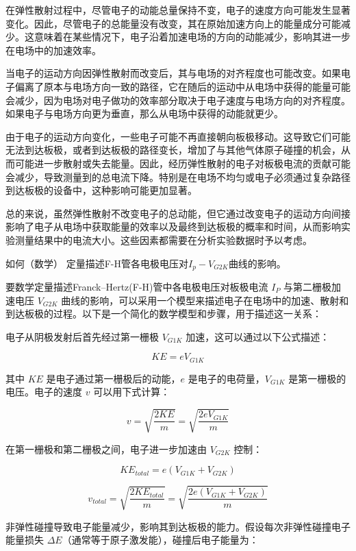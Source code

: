 \documentclass[dvipsnames, svgnames,a4paper,11pt]{article}
\begin{document}
	在弹性散射过程中，尽管电子的动能总量保持不变，电子的速度方向可能发生显著变化。因此，尽管电子的总能量没有改变，其在原始加速方向上的能量成分可能减少。这意味着在某些情况下，电子沿着加速电场的方向的动能减少，影响其进一步在电场中的加速效率。
	
	当电子的运动方向因弹性散射而改变后，其与电场的对齐程度也可能改变。如果电子偏离了原本与电场方向一致的路径，它在随后的运动中从电场中获得的能量可能会减少，因为电场对电子做功的效率部分取决于电子速度与电场方向的对齐程度。如果电子与电场方向更为垂直，那么从电场中获得的动能就更少。
	
	由于电子的运动方向变化，一些电子可能不再直接朝向板极移动。这导致它们可能无法到达板极，或者到达板极的路径变长，增加了与其他气体原子碰撞的机会，从而可能进一步散射或失去能量。因此，经历弹性散射的电子对板极电流的贡献可能会减少，导致测量到的总电流下降。特别是在电场不均匀或电子必须通过复杂路径到达板极的设备中，这种影响可能更加显著。
	
	总的来说，虽然弹性散射不改变电子的总动能，但它通过改变电子的运动方向间接影响了电子从电场中获取能量的效率以及最终到达板极的概率和时间，从而影响实验测量结果中的电流大小。这些因素都需要在分析实验数据时予以考虑。
	
	
	\begin{question}
		如何（数学） 定量描述F-H管各电极电压对$I_p-V_{G2K}$曲线的影响。
	\end{question}
	要数学定量描述Franck–Hertz(F-H)管中各电极电压对板极电流 \(I_P\) 与第二栅极加速电压 \(V_{G2K}\) 曲线的影响，可以采用一个模型来描述电子在电场中的加速、散射和到达板极的过程。以下是一个简化的数学模型和步骤，用于描述这一关系：
	
	电子从阴极发射后首先经过第一栅极 \(V_{G1K}\) 加速，这可以通过以下公式描述：
	
	\[ KE = e V_{G1K} \]
	
	其中 \(KE\) 是电子通过第一栅极后的动能，\(e\) 是电子的电荷量，\(V_{G1K}\) 是第一栅极的电压。电子的速度 \(v\) 可以用下式计算：
	
	\[ v = \sqrt{\frac{2KE}{m}} = \sqrt{\frac{2eV_{G1K}}{m}} \]
	
	在第一栅极和第二栅极之间，电子进一步加速由 \(V_{G2K}\) 控制：
	
	\[ KE_{total} = e (V_{G1K} + V_{G2K}) \]
	
	\[ v_{total} = \sqrt{\frac{2KE_{total}}{m}} = \sqrt{\frac{2e(V_{G1K} + V_{G2K})}{m}} \]
	
	非弹性碰撞导致电子能量减少，影响其到达板极的能力。假设每次非弹性碰撞电子能量损失 \( \Delta E \)（通常等于原子激发能），碰撞后电子能量为：
	
\end{document}
